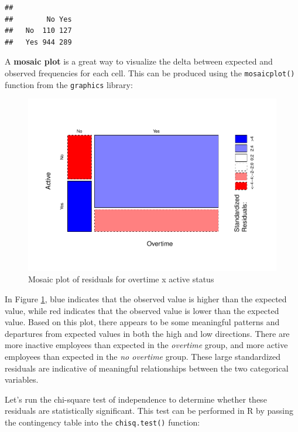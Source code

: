 \documentclass[
]{book}
\begin{document}
\begin{verbatim}
##      
##        No Yes
##   No  110 127
##   Yes 944 289
\end{verbatim}

A \textbf{mosaic plot} is a great way to visualize the delta between expected and observed frequencies for each cell. This can be produced using the \texttt{mosaicplot()} function from the \texttt{graphics} library:

\begin{figure}

{\centering \includegraphics[width=1\linewidth]{The_Fundamentals_of_People_Analytics_files/figure-latex/mosaic-plot-1} 

}

\caption{Mosaic plot of residuals for overtime x active status}\label{fig:mosaic-plot}
\end{figure}

In Figure \ref{fig:mosaic-plot}, blue indicates that the observed value is higher than the expected value, while red indicates that the observed value is lower than the expected value. Based on this plot, there appears to be some meaningful patterns and departures from expected values in both the high and low directions. There are more inactive employees than expected in the \emph{overtime} group, and more active employees than expected in the \emph{no overtime} group. These large standardized residuals are indicative of meaningful relationships between the two categorical variables.

Let's run the chi-square test of independence to determine whether these residuals are statistically significant. This test can be performed in R by passing the contingency table into the \texttt{chisq.test()} function:
\end{document}
